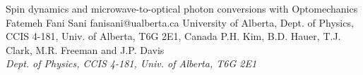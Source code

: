 \begin{conf-abstract}[]
{Spin dynamics and  microwave-to-optical photon conversions with Optomechanics}
{\color{blue} Fatemeh Fani Sani}
{fanisani@ualberta.ca}
{University of Alberta, Dept. of Physics, CCIS 4-181, Univ. of Alberta, T6G 2E1, Canada}
{{\color{blue}P.H. Kim, B.D. Hauer, T.J. Clark, M.R. Freeman and J.P. Davis}\\ \textit{Dept. of Physics, CCIS 4-181, Univ. of Alberta, T6G 2E1}\\ 
\decofourleft \decofourright}





\printbibliography[heading=none]

\end{conf-abstract}
